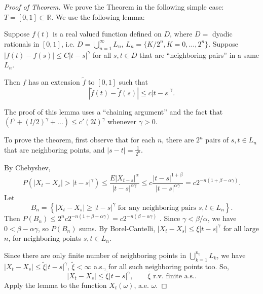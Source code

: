 \begin{proof}[Proof of Theorem]
	We prove the Theorem in the following simple case: $T = [0,1] \subset \mathbb{R}$. We use the following lemma:
	\begin{lemma} Suppose $f(t) $ is a real valued function defined on $D$, where $D = $ dyadic rationals in $[0,1]$, i.e. $D = \bigcup_{n = 1} ^\infty L_n$, $L_n = \{K / 2^n, K = 0, \ldots, 2^n\} $. Suppose $\left| f(t) - f(s) \right| \le  C|t - s|^\gamma$ for all $s, t \in D$ that are ``neighboring pairs'' in a same $L_n$. 
		
		Then $f$ has an extension $\tilde f$ to $[0,1]$ such that
		\[
			\left| \tilde f(t) - \tilde f(s) \right| 
			\le  c |t - s|^\gamma
		.\] 
	\end{lemma}
	The proof of this lemma uses a ``chaining argument'' and the fact that $\left( l^\gamma + (l / 2)^\gamma + \ldots\right) \le  c' (2 l)^\gamma  $ whenever $\gamma > 0$.

	To prove the theorem, first observe that for each $n$, there are $2^n$ pairs of $s,t \in L_n$ that are neighboring points, and $\left| s - t \right| = \frac{1}{2^n}$.

	By Chebyshev,
	\[
		P\left( |X_t - X_s| > |t - s|^\gamma \right) 
		\le \frac{E|X_{t - s}|^\alpha}{|t - s|^{\alpha \gamma}}
		\le c \frac{|t - s|^{1 + \beta}}{|t - s|^{\alpha \gamma}}
		= c 2^{-n (1 + \beta - \alpha \gamma)}
	.\] 
	Let
	\[
		B_n = \left\{|X_t - X_s| \ge |t - s|^\gamma \text{ for any neighboring pairs } s, t \in L_n\right\} 
	.\] 
	Then $P(B_n) \le  2^n c 2^{-n (1 + \beta - \alpha \gamma)} = c 2^{- n\left( \beta - \alpha \gamma \right) } $ .
	Since $\gamma < \beta / \alpha$, we have $0 < \beta - \alpha \gamma$, so $P(B_n)$ sums. By Borel-Cantelli, $|X_t - X_s| \le  \xi |t - s|^\gamma$ for all large $n$, for neighboring points $s, t \in L_n$.

	Since there are only finite number of neighboring points in $\bigcup_{k = 1} ^{n_0} L_k$, we have $|X_t - X_s| \le  \tilde \xi |t - s|^\gamma$, $\tilde \xi < \infty $ a.s., for all such neighboring points too. So,
	\[
		|X_t - X_s| \le \overline{\xi} |t - s|^\gamma, \qquad \overline{\xi} \text{ r.v. finite a.s.} 
	.\] 
	Apply the lemma to the function $X_t(\omega)$, a.e. $\omega$.
\end{proof}






